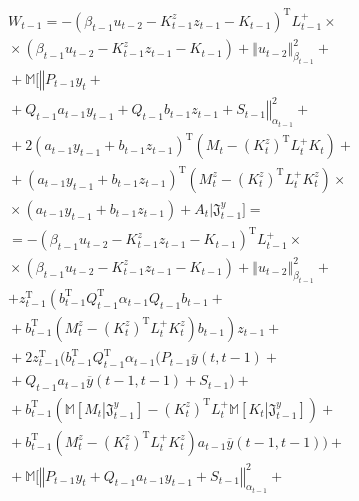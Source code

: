 \begin{multicols}{2}
\noindent
\begin{multline*}
W_{t-1} =
-\left( \beta_{t-1} u_{t-2} - K_{t-1}^z z_{t-1} - K_{t-1} \right)^{\mathrm{T}}
L_{t-1}^+\times{}\\
{}\times
\left(\beta_{t-1} u_{t-2} - K_{t-1}^z z_{t-1} - K_{t-1} \right) +
\left\Vert u_{t-2}\right\Vert^2_{\beta_{t-1}} +{}\\
{}+ \mathbb{M} \Big[
 \left\Vert P_{t-1} y_t +{}\right.\\
\left. {}+ Q_{t-1}a_{t-1} y_{t-1} + Q_{t-1} b_{t-1} z_{t-1}
+ S_{t-1} \right\Vert^2_{\alpha_{t-1}} +{}\\
{}+ 2\left( a_{t-1} y_{t-1} + b_{t-1} z_{t-1} \right)^{\mathrm{T}}
\left(M_t - \left( K_t^z\right)^{\mathrm{T}} L_t^+ K_t \right) +{}\\
{}+ \left( a_{t-1} y_{t-1} + b_{t-1} z_{t-1} \right)^{\mathrm{T}}
\left(M_t^z - \left( K_t^z\right)^{\mathrm{T}} L_t^+ K_t^z \right)\times{}\\
{}\times
\left( a_{t-1} y_{t-1} + b_{t-1} z_{t-1}   \right) +A_t
\Big\vert
\mathfrak{J}_{t-1}^y \Big] ={}\\
{}= -\left( \beta_{t-1} u_{t-2} - K_{t-1}^z z_{t-1} - K_{t-1} \right)^{\mathrm{T}}
L_{t-1}^+ \times{}\\
{}\times
\left(\beta_{t-1} u_{t-2} - K_{t-1}^z z_{t-1} - K_{t-1} \right) +
\left\Vert u_{t-2}\right\Vert^2_{\beta_{t-1}} +{}\\
+z_{t-1}^{\mathrm{T}} \left( b_{t-1}^{\mathrm{T}} Q_{t-1}^{\mathrm{T}}
\alpha_{t-1} Q_{t-1} b_{t-1} +{}\right.\\
\left.{}+b_{t-1}^{\mathrm{T}}
\left(M_t^z - \left( K_t^z\right)^{\mathrm{T}} L_t^+ K_t^z \right) b_{t-1}\right) z_{t-1} +{}\\[9pt]
{}+ 2 z_{t-1}^{\mathrm{T}}
\Big(
b_{t-1}^{\mathrm{T}} Q_{t-1}^{\mathrm{T}} \alpha_{t-1} \big(
P_{t-1} \overline{y}(t, t-1) +{}\\
{}+ Q_{t-1} a_{t-1}
\overline{y}(t-1, t-1) + S_{t-1} \big) +{}\\
{}+ b_{t-1}^{\mathrm{T}} \left(\mathbb{M}\left[ M_t \left\vert \mathfrak{J}_{t-1}^y \right. \right]
- \left( K_t^z\right)^{\mathrm{T}} L_t^+ \mathbb{M}\left[ K_t \left\vert \mathfrak{J}_{t-1}^y
\right. \right] \right) +{}\\
{}+ b_{t-1}^{\mathrm{T}} \left(M_t^z - \left( K_t^z\right)^{\mathrm{T}} L_t^+ K_t^z \right) a_{t-1}
 \overline{y} (t-1, t-1)
\Big) +{}\\
{}+ \mathbb{M} \Big[
\left\Vert P_{t-1} y_t + Q_{t-1}a_{t-1} y_{t-1} +
S_{t-1} \right\Vert^2_{\alpha_{t-1}} +{}\\

\end{multline*}
\end{multicols}

